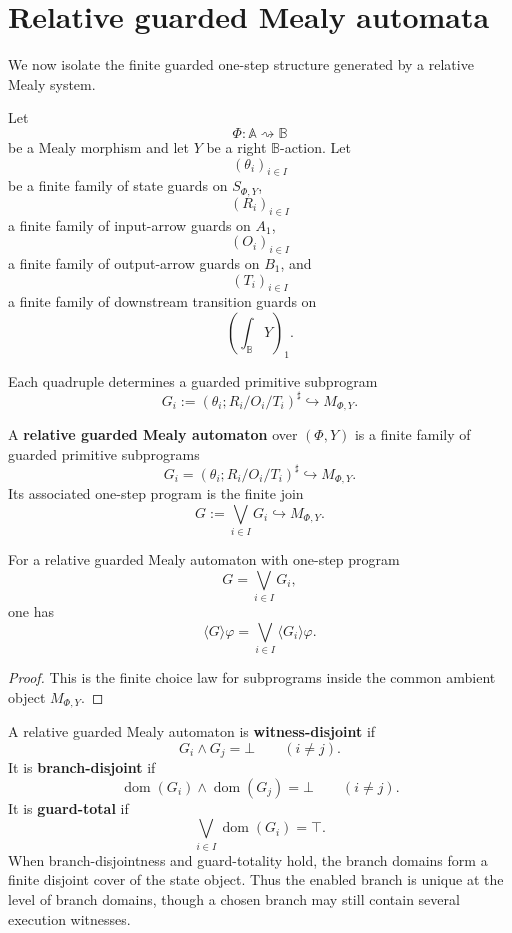 \section{Relative guarded Mealy automata}
\label{sec:poly-relative-guarded-mealy-automata}

We now isolate the finite guarded one-step structure generated by a relative
Mealy system.

Let
\[
\Phi:\mathbb A\rightsquigarrow\mathbb B
\]
be a Mealy morphism and let \(Y\) be a right \(\mathbb B\)-action.  Let
\[
(\theta_i)_{i\in I}
\]
be a finite family of state guards on \(S_{\Phi,Y}\),
\[
(R_i)_{i\in I}
\]
a finite family of input-arrow guards on \(A_1\),
\[
(O_i)_{i\in I}
\]
a finite family of output-arrow guards on \(B_1\), and
\[
(T_i)_{i\in I}
\]
a finite family of downstream transition guards on
\[
\left(\int_{\mathbb B}Y\right)_1.
\]

Each quadruple determines a guarded primitive subprogram
\[
G_i:=(\theta_i;R_i/O_i/T_i)^\sharp\hookrightarrow M_{\Phi,Y}.
\]

\begin{definition}
\label{def:poly-relative-guarded-mealy-automaton}
A \textbf{relative guarded Mealy automaton} over \((\Phi,Y)\) is a finite
family of guarded primitive subprograms
\[
G_i=(\theta_i;R_i/O_i/T_i)^\sharp\hookrightarrow M_{\Phi,Y}.
\]
Its associated one-step program is the finite join
\[
G:=\bigvee_{i\in I}G_i\hookrightarrow M_{\Phi,Y}.
\]
\end{definition}

\begin{proposition}
\label{prop:poly-relative-guarded-automaton-diamond}
For a relative guarded Mealy automaton with one-step program
\[
G=\bigvee_{i\in I}G_i,
\]
one has
\[
\langle G\rangle\varphi
=
\bigvee_{i\in I}\langle G_i\rangle\varphi.
\]
\end{proposition}

\begin{proof}
This is the finite choice law for subprograms inside the common ambient object
\(M_{\Phi,Y}\).
\end{proof}

A relative guarded Mealy automaton is \textbf{witness-disjoint} if
\[
G_i\wedge G_j=\bot
\qquad
(i\ne j).
\]
It is \textbf{branch-disjoint} if
\[
\operatorname{dom}(G_i)\wedge\operatorname{dom}(G_j)=\bot
\qquad
(i\ne j).
\]
It is \textbf{guard-total} if
\[
\bigvee_{i\in I}\operatorname{dom}(G_i)=\top.
\]
When branch-disjointness and guard-totality hold, the branch domains form a
finite disjoint cover of the state object.  Thus the enabled branch is unique
at the level of branch domains, though a chosen branch may still contain
several execution witnesses.


